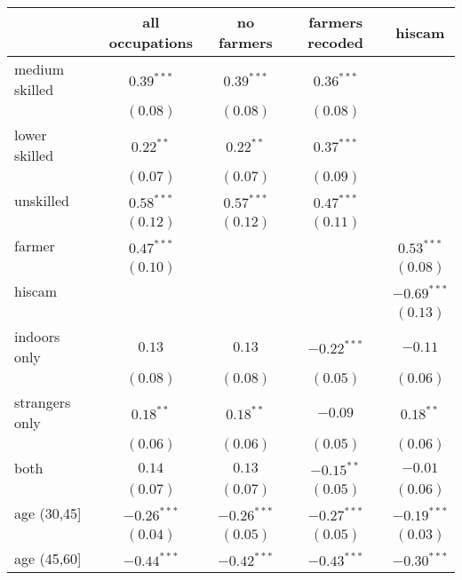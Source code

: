 
\begin{table}
\begin{center}
\begin{tabular}{l c c c c}
\hline
 & all occupations & no farmers & farmers recoded & hiscam \\
\hline
medium skilled & $0.39^{***}$  & $0.39^{***}$  & $0.36^{***}$  &               \\
               & $(0.08)$      & $(0.08)$      & $(0.08)$      &               \\
lower skilled  & $0.22^{**}$   & $0.22^{**}$   & $0.37^{***}$  &               \\
               & $(0.07)$      & $(0.07)$      & $(0.09)$      &               \\
unskilled      & $0.58^{***}$  & $0.57^{***}$  & $0.47^{***}$  &               \\
               & $(0.12)$      & $(0.12)$      & $(0.11)$      &               \\
farmer         & $0.47^{***}$  &               &               & $0.53^{***}$  \\
               & $(0.10)$      &               &               & $(0.08)$      \\
hiscam         &               &               &               & $-0.69^{***}$ \\
               &               &               &               & $(0.13)$      \\
indoors only   & $0.13$        & $0.13$        & $-0.22^{***}$ & $-0.11$       \\
               & $(0.08)$      & $(0.08)$      & $(0.05)$      & $(0.06)$      \\
strangers only & $0.18^{**}$   & $0.18^{**}$   & $-0.09$       & $0.18^{**}$   \\
               & $(0.06)$      & $(0.06)$      & $(0.05)$      & $(0.06)$      \\
both           & $0.14$        & $0.13$        & $-0.15^{**}$  & $-0.01$       \\
               & $(0.07)$      & $(0.07)$      & $(0.05)$      & $(0.06)$      \\
age (30,45]    & $-0.26^{***}$ & $-0.26^{***}$ & $-0.27^{***}$ & $-0.19^{***}$ \\
               & $(0.04)$      & $(0.05)$      & $(0.05)$      & $(0.03)$      \\
age (45,60]    & $-0.44^{***}$ & $-0.42^{***}$ & $-0.43^{***}$ & $-0.30^{***}$ \\

\end{tabular}
\end{center}
\end{table}
